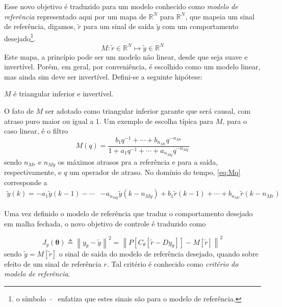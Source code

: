 Esse novo objetivo é traduzido para um modelo conhecido como \textit{modelo de referência} representado aqui por um mapa de $\mathbb{R}^{N}$ para $\mathbb{R}^{N}$, que mapeia um sinal de referência, digamos, $\tilde{r}$ para um sinal de saída $\tilde{y}$ com um comportamento desejado\footnote{o símbolo \ $\tilde{}$ \ enfatiza que estes sinais são para o modelo de referência.}.
\begin{equation}
   M:\tilde{r} \in \mathbb{R}^N \mapsto \tilde{y} \in \mathbb{R}^N
\label{eq:Mmap}
\end{equation}
Este mapa, a princípio pode ser um modelo não linear, desde que seja suave e invertível. Porém, em geral, por conveniência, é escolhido como um modelo linear, mas ainda sim deve ser invertível. Defini-se a seguinte hipótese:
\begin{assum}
   $M$ é triangular inferior e invertível.
\end{assum}
O fato de $M$ ser adotado como triangular inferior garante que será causal, com atraso puro maior ou igual a 1.
Um exemplo de escolha típica para $M$, para o caso linear, é o filtro
\begin{equation}
   M(q)=\frac{b_{1} q^{-1}+\cdots+b_{n_{M r}} q^{-n_{M r}}}{1+a_{1} q^{-1}+\cdots+a_{n_{M y}} q^{-n_{M y}}}
\label{eq:Mq}
\end{equation}
sendo $n_{Mr}$ e $n_{My}$ os máximos atrasos pra a referência e para a saída, respectivamente, e $q$ um operador de atraso. No domínio do tempo, \eqref{eq:Mq} corresponde a 
\begin{align}
   \label{eq:ytMr}
   \tilde{y}(k)=-a_{1} \tilde{y}(k-1)-\cdots &-a_{n_{M y}} \tilde{y}\left(k-n_{M y}\right) +b_{1} \tilde{r}(k-1)+\cdots+b_{n_{M r}} \tilde{r}\left(k-n_{M r}\right)
\end{align}

Uma vez definido o modelo de referência que traduz o comportamento desejado em malha fechada, o novo objetivo de controle é traduzido como

\begin{equation}
   J_y(\bm{\theta}) \triangleq \left\lVert y_\theta - \tilde{y} \right\lVert^{2} = \left\lVert P[C_\theta[\tilde{r}-Dy_\theta]] - M[\tilde{r}] \right\lVert^{2}
   \label{eq:Jy}
\end{equation}
sendo $\tilde{y} = M[\tilde{r}]$ o sinal de saída do modelo de referência desejado, quando sobre efeito de um sinal de referência $r$. Tal critério é conhecido como \textit{critério do modelo de referência}.


